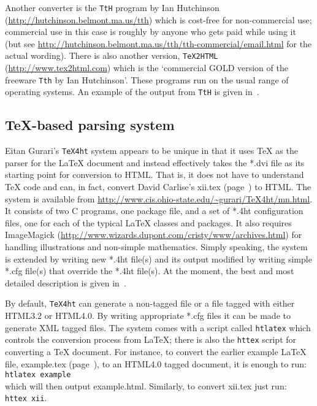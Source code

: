 \documentclass[11pt]{article}
\newcommand{\file}[1]{\textsf{#1}}
\newcommand{\program}[1]{\texttt{#1}}
\newcommand{\tex}{TeX}
\newcommand{\latex}{LaTeX}
\begin{document}
    Another converter is the \program{TtH} program by Ian Hutchinson 
(\url{http://hutchinson.belmont.ma.us/tth}) which is cost-free for 
non-commercial use; commercial use in this case is roughly by anyone who gets
paid while using it 
(but see \url{http://hutchinson.belmont.ma.us/tth/tth-commercial/email.html} 
for the actual wording). There is also another version, \program{TeX2HTML}
(\url{http://www.tex2html.com}) which is the `commercial GOLD version of
the freeware \program{Tth} by Ian Hutchinson'. These programs run on the usual
range of operating systems. An example of the output from \program{TtH} is
given in~\cite{GOOSSENS99}.

\subsection{TeX-based parsing system}

    Eitan Gurari's \program{TeX4ht} system appears to be unique in that
it uses \tex{} as the parser for the \latex{} document and instead effectively
takes the \file{*.dvi} file as its starting point for conversion to HTML.
That is, it does not have to understand \tex{} code and can, in fact, convert
David Carlise's \file{xii.tex} (page~\pageref{code:xii}) to HTML.
The system is available from 
\url{http://www.cis.ohio-state.edu/~gurari/TeX4ht/mn.html}. It consists of 
two C programs, one package file, and a set of \file{*.4ht} configuration 
files, one for each of the typical LaTeX{} classes and packages. It also
requires ImageMagick 
(\url{http://www.wizards.dupont.com/cristy/www/archives.html}) for handling
illustrations and non-simple mathematics.
Simply speaking, the system
is extended by writing new \file{*.4ht} file(s) and its output modified
by writing simple \file{*.cfg} file(s) that override the \file{*.4ht} file(s).
At the moment, the best and most detailed description is given 
in~\cite{GOOSSENS99}.

    By default, \program{TeX4ht} can generate a non-tagged file or a file
tagged with either HTML3.2 or HTML4.0. By writing appropriate \file{*.cfg}
files it can be made to generate XML tagged files. The system comes with a 
script called \program{htlatex} which controls the conversion process from
\latex; there is also the \program{httex} script for converting a \tex{} document.
For instance, to convert the earlier example LaTeX{} file, 
\file{example.tex} (page~\pageref{code:example}),
 to an HTML4.0 tagged document, it is enough to run: \\
\texttt{htlatex example} \\
which will then output \file{example.html}. Similarly, to convert 
\file{xii.tex} just run: \\
\texttt{httex xii}. 
\end{document}
